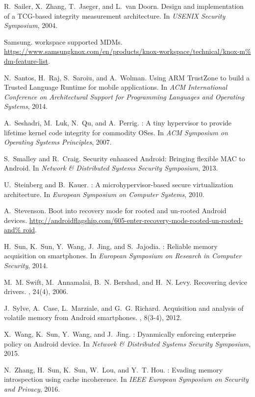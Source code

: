 \documentclass[pageno]{sig-alternate-05-2015}
\begin{document}
\begin{thebibliography}{10}
R.~Sailer, X.~Zhang, T.~Jaeger, and L.~van Doorn.
\newblock Design and implementation of a {TCG}-based integrity measurement
  architecture.
\newblock In {\em USENIX Security Symposium}, 2004.

Samsung.
 workspace supported {MDMs}.
\newblock
  \url{https://www.samsungknox.com/en/products/knox-workspace/technical/knox-m%
dm-feature-list}.

N.~Santos, H.~Raj, S.~Saroiu, and A.~Wolman.
\newblock Using {ARM} {TrustZone} to build a {Trusted Language Runtime} for
  mobile applications.
\newblock In {\em ACM International Conference on Architectural Support for
  Programming Languages and Operating Systems}, 2014.

A.~Seshadri, M.~Luk, N.~Qu, and A.~Perrig.
: {A} tiny hypervisor to provide lifetime kernel code
  integrity for commodity {OSes}.
\newblock In {\em ACM Symposium on Operating Systems Principles}, 2007.

S.~Smalley and R.~Craig.
\newblock Security enhanced {Android}: {Bringing} flexible {MAC} to {Android}.
\newblock In {\em Network \& Distributed Systems Security Symposium}, 2013.

U.~Steinberg and B.~Kauer.
: {A} microhypervisor-based secure virtualization architecture.
\newblock In {\em European Symposium on Computer Systems}, 2010.

A.~Stevenson.
\newblock Boot into recovery mode for rooted and un-rooted {Android} devices.
\newblock
  \url{http://androidflagship.com/605-enter-recovery-mode-rooted-un-rooted-and%
roid}.

H.~Sun, K.~Sun, Y.~Wang, J.~Jing, and S.~Jajodia.
: {Reliable} memory acquisition on smartphones.
\newblock In {\em European Symposium on Research in Computer Security}, 2014.

M.~M. Swift, M.~Annamalai, B.~N. Bershad, and H.~N. Levy.
\newblock Recovering device drivers.
, 24(4), 2006.

J.~Sylve, A.~Case, L.~Marziale, and G.~G. Richard.
\newblock Acquisition and analysis of volatile memory from {Android}
  smartphones.
, 8(3-4), 2012.

X.~Wang, K.~Sun, Y.~Wang, and J.~Jing.
: {Dyanmically} enforcing enterprise policy on {Android}
  device.
\newblock In {\em Network \& Distributed Systems Security Symposium}, 2015.

N.~Zhang, H.~Sun, K.~Sun, W.~Lou, and Y.~T. Hou.
: {Evading} memory introspection using cache incoherence.
\newblock In {\em IEEE European Symposium on Security and Privacy}, 2016.

\end{thebibliography}
\end{document}
